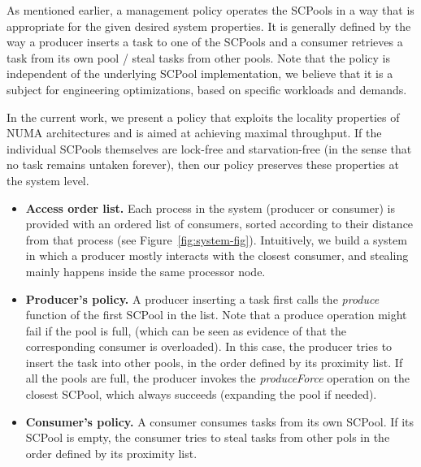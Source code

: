 As mentioned earlier, a management policy operates the SCPools in a way that is appropriate for the given desired system properties.
It is generally defined by the way a producer inserts a task to one of the SCPools and a consumer retrieves a task from its own pool / steal tasks from other pools. 
Note that the policy is independent of the underlying SCPool implementation, we believe that it is a subject for engineering optimizations, based on specific workloads and demands.


In the current work, we present a policy that exploits the locality properties of NUMA architectures and is aimed at achieving maximal throughput. If the individual SCPools themselves are lock-free and starvation-free (in the sense that no task remains untaken forever), then our policy preserves these properties at the system level. 
\begin{itemize}
	\item {\bf Access order list.} Each process in the system (producer or consumer) is provided with an ordered list of consumers, sorted according to their distance from that process (see Figure~\ref{fig:system-fig}). Intuitively, we build a system in which a producer mostly interacts with the closest consumer, and stealing mainly happens inside the same processor node. 
	\item {\bf Producer's policy.} A producer inserting a task first calls the \emph{produce} function of the first SCPool in the list. Note that a produce operation might fail if the pool is full, (which can be seen as evidence of that the corresponding consumer is overloaded).  In this case, the producer tries to insert the task into other pools, in the order defined by its proximity list. If all the pools are full, the producer invokes the \emph{produceForce} operation on the closest SCPool, which always succeeds (expanding the pool if needed). 
	\item {\bf Consumer's policy.} A consumer consumes tasks from its own SCPool. If its SCPool is empty, the consumer tries to steal tasks from other pols in the order defined by its proximity list. 
\end{itemize}





